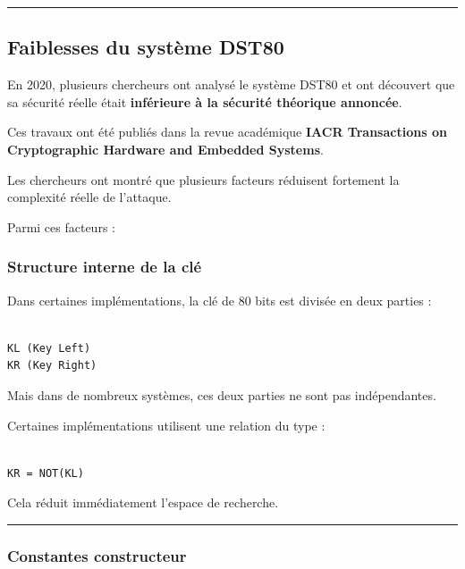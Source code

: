 \documentclass[
  french,
]{article}
\begin{document}
\begin{center}\rule{0.5\linewidth}{0.5pt}\end{center}

\subsection{Faiblesses du système
DST80}\label{faiblesses-du-systuxe8me-dst80}

En 2020, plusieurs chercheurs ont analysé le système DST80 et ont
découvert que sa sécurité réelle était \textbf{inférieure à la sécurité
théorique annoncée}.

Ces travaux ont été publiés dans la revue académique \textbf{IACR
Transactions on Cryptographic Hardware and Embedded Systems}.

Les chercheurs ont montré que plusieurs facteurs réduisent fortement la
complexité réelle de l'attaque.

Parmi ces facteurs :

\subsubsection{Structure interne de la
clé}\label{structure-interne-de-la-cluxe9}

Dans certaines implémentations, la clé de 80 bits est divisée en deux
parties :

\begin{verbatim}

KL (Key Left)
KR (Key Right)
\end{verbatim}

Mais dans de nombreux systèmes, ces deux parties ne sont pas
indépendantes.

Certaines implémentations utilisent une relation du type :

\begin{verbatim}

KR = NOT(KL)
\end{verbatim}

Cela réduit immédiatement l'espace de recherche.

\begin{center}\rule{0.5\linewidth}{0.5pt}\end{center}

\subsubsection{Constantes constructeur}\label{constantes-constructeur}
\end{document}
